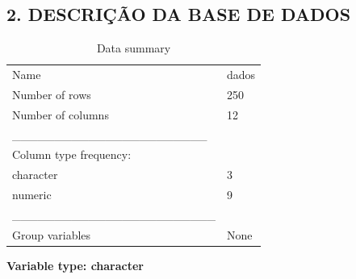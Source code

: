 \documentclass[
  letterpaper,
  DIV=11,
  numbers=noendperiod]{scrartcl}
\begin{document}
\subsection{\texorpdfstring{\textbf{2. DESCRIÇÃO DA BASE DE
DADOS}}{2. DESCRIÇÃO DA BASE DE DADOS}}\label{descriuxe7uxe3o-da-base-de-dados}

\begin{longtable}[]{@{}ll@{}}
\caption{Data summary}\tabularnewline
\toprule\noalign{}
\endfirsthead
\endhead
\bottomrule\noalign{}
\endlastfoot
Name & dados \\
Number of rows & 250 \\
Number of columns & 12 \\
\_\_\_\_\_\_\_\_\_\_\_\_\_\_\_\_\_\_\_\_\_\_\_ & \\
Column type frequency: & \\
character & 3 \\
numeric & 9 \\
\_\_\_\_\_\_\_\_\_\_\_\_\_\_\_\_\_\_\_\_\_\_\_\_ & \\
Group variables & None \\
\end{longtable}

\textbf{Variable type: character}
\end{document}
